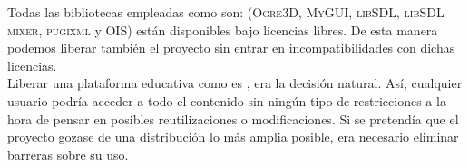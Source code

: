 \documentclass[a4paper,11pt]{article}
\begin{document}
\noindent Todas las bibliotecas empleadas como son: (\textsc{Ogre3D}, \textsc{MyGUI},
\textsc{libSDL}, \textsc{libSDL mixer}, \textsc{pugixml} y \textsc{OIS}) están disponibles
bajo licencias libres. De esta manera podemos liberar también el proyecto
sin entrar en incompatibilidades con dichas licencias.\\

\noindent Liberar una plataforma educativa como es \wiki, era la decisión
natural. Así, cualquier usuario podría acceder a todo el contenido sin
ningún tipo de restricciones a la hora de pensar en posibles reutilizaciones
o modificaciones. Si se pretendía que el proyecto gozase de una distribución
lo más amplia posible, era necesario eliminar barreras sobre su uso.\\

\clearpage
{}
{}


\end{document}
